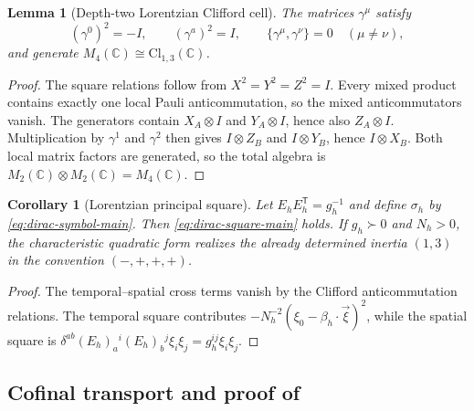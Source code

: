 \documentclass[11pt]{article}
\newtheorem{lemma}[lemma]{Lemma}
\newtheorem{corollary}[corollary]{Corollary}
\theoremstyle{definition}
\theoremstyle{remark}
\newcommand{\C}{\mathbb C}
\newcommand{\Cl}{\mathrm{Cl}}
\begin{document}
\begin{lemma}[Depth-two Lorentzian Clifford cell]
\label{lem:supp-clifford-cell}
The matrices $\gamma^\mu$ satisfy
\begin{equation}
 (\gamma^0)^2=-I,
 \qquad
 (\gamma^a)^2=I,
 \qquad
 \{\gamma^\mu,\gamma^\nu\}=0\quad(\mu\ne\nu),
 \label{eq:supp-clifford-relations}
\end{equation}
and generate $M_4(\C)\cong\Cl_{1,3}(\C)$.
\end{lemma}

\begin{proof}
The square relations follow from $X^2=Y^2=Z^2=I$.  Every mixed product contains
exactly one local Pauli anticommutation, so the mixed anticommutators vanish.
The generators contain $X_A\otimes I$ and $Y_A\otimes I$, hence also
$Z_A\otimes I$.  Multiplication by $\gamma^1$ and $\gamma^2$ then gives
$I\otimes Z_B$ and $I\otimes Y_B$, hence $I\otimes X_B$.  Both local matrix
factors are generated, so the total algebra is
$M_2(\C)\otimes M_2(\C)=M_4(\C)$.
\end{proof}

\begin{corollary}[Lorentzian principal square]
\label{cor:supp-lorentzian-square}
Let $E_hE_h^{\mathsf T}=g_h^{-1}$ and define $\sigma_h$ by
\eqref{eq:dirac-symbol-main}.  Then \eqref{eq:dirac-square-main} holds.
If $g_h\succ0$ and $N_h>0$, the characteristic quadratic form realizes the
already determined inertia $(1,3)$ in the convention $(-,+,+,+)$.
\end{corollary}

\begin{proof}
The temporal--spatial cross terms vanish by the Clifford anticommutation
relations.  The temporal square contributes
$-N_h^{-2}(\xi_0-\beta_h\cdot\vec\xi)^2$, while the spatial square is
$\delta^{ab}(E_h)_a{}^i(E_h)_b{}^j\xi_i\xi_j=g_h^{ij}\xi_i\xi_j$.
\end{proof}

\subsection{Cofinal transport and proof of \texorpdfstring{}{the ADM reconstruction theorem}}
\end{document}
